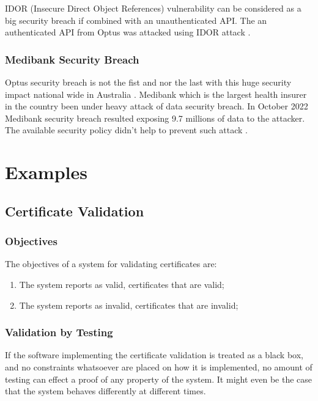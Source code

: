 \documentclass[journal]{IEEEtran}
\begin{document}
IDOR (Insecure Direct Object References) vulnerability can be considered as a big security
breach if combined with an unauthenticated API. The an authenticated API from Optus was attacked
using IDOR attack \cite{james2022}.

\subsubsection{Medibank Security Breach}
Optus security breach is not the fist and nor the last with this huge security impact national
wide in Australia \cite{medibank2022}\cite{maurice2023}. Medibank which is the largest health
insurer in the country been under heavy attack of data security breach. In October 2022 Medibank
security breach resulted exposing 9.7 millions of data to the attacker. The available security policy
didn't help to prevent such attack \cite{biddle2022p}.


\section{Examples}

\subsection{Certificate Validation}

\subsubsection{Objectives}

The objectives of a system for validating certificates are:
\begin{enumerate}[CO-1]
  \item\label{validates1} The system reports as valid, certificates that are valid;
  \item\label{validates2} The system reports as invalid, certificates that are invalid;
\end{enumerate}

\subsubsection{Validation by Testing}

If the software implementing the certificate validation is treated
as a black box, and no constraints whatsoever are placed on how it is
implemented, no amount of testing can effect a proof of any
property of the system. It might even be the case that the system
behaves differently at different times.
\end{document}
